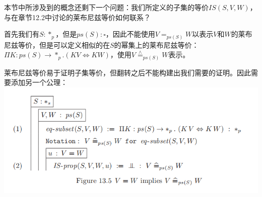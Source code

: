 \documentclass[UTF8]{article}
\begin{document}
		本节中所涉及到的概念还剩下一个问题：我们所定义的子集的等价$IS(S,V,W)$，与在章节12.2中讨论的莱布尼兹等价如何联系？
		
		首先我们有$S:*_p$，但是$ps(S):\square$，因此不能使用$V=_{ps(S)}W$以表示$V$和$W$的莱布尼兹等价，但是可以定义相似的在$S$的幂集上的莱布尼兹等价：$\Pi K:ps(S)\rightarrow*_p.(KV\Leftrightarrow KW)$，使用$V\stackrel{\wedge}{=}_{ps(S)}W$表示。
		
		莱布尼兹等价易于证明子集等价，但翻转之后不能构建出我们需要的证明。因此需要添加另一个公理：\\
		\includegraphics[width=0.93\linewidth]{"../imgs/13-5.png"}
\end{document}
